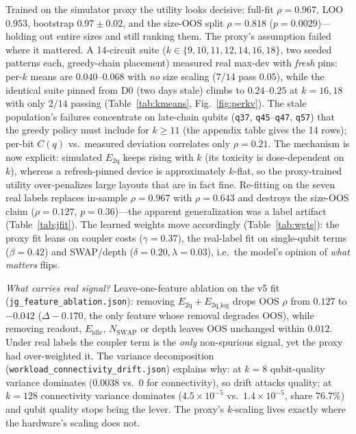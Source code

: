 \documentclass[journal,10pt,twocolumn]{IEEEtran}
\newcommand{\q}[1]{\texttt{q#1}}
\begin{document}
Trained on the simulator proxy the utility looks decisive: full-fit $\rho{=}0.967$, LOO $0.953$, bootstrap
$0.97{\pm}0.02$, and the size-OOS split $\rho{=}0.818$ ($p{=}0.0029$)---holding out entire sizes and still ranking
them. The proxy's assumption failed where it mattered. A 14-circuit suite
($k\in\{9,10,11,12,14,16,18\}$, two seeded patterns each, greedy-chain placement) measured real max-dev with
\emph{fresh} pins: per-$k$ means are $0.040$--$0.068$ with \emph{no} size scaling ($7/14$ pass $0.05$), while the
identical suite pinned from D0 (two days stale) climbs to $0.24$--$0.25$ at $k{=}16,18$ with only $2/14$ passing
(Table~\ref{tab:kmeans}, Fig.~\ref{fig:perkv}). The stale population's failures concentrate on late-chain qubits
(\q{37}, \q{45}--\q{47}, \q{57}) that the greedy policy must include for $k\ge11$ (the appendix table gives the
14 rows); per-bit $C(q)$ vs.\ measured deviation correlates only $\rho{=}0.21$. The mechanism is now explicit:
simulated $E_{\mathrm{2q}}$ keeps rising with $k$ (its toxicity is dose-dependent on $k$), whereas a refresh-pinned
device is approximately $k$-flat, so the proxy-trained utility over-penalizes large layouts that are in fact fine.
Re-fitting on the seven real labels replaces in-sample $\rho{=}0.967$ with $\rho{=}0.643$ and destroys the
size-OOS claim ($\rho{=}0.127$, $p{=}0.36$)---the apparent generalization was a label artifact
(Table~\ref{tab:jfit}). The learned weights move accordingly (Table~\ref{tab:wgts}): the proxy fit leans on coupler
costs ($\gamma{=}0.37$), the real-label fit on single-qubit terms ($\beta{=}0.42$) and SWAP/depth
($\delta{=}0.20,\lambda{=}0.03$), i.e.\ the model's opinion of \emph{what matters} flips.

\emph{What carries real signal?} Leave-one-feature ablation on the v5 fit (\texttt{jg\_feature\_ablation.json}):
removing $E_{\mathrm{2q}}{+}E_{\mathrm{2q\_log}}$ drops OOS $\rho$ from $0.127$ to $-0.042$
($\Delta{-}0.170$, the only feature whose removal degrades OOS), while removing readout, $E_{\mathrm{idle}}$,
$N_{\mathrm{SWAP}}$ or depth leaves OOS unchanged within $0.012$. Under real labels the coupler term is the
\emph{only} non-spurious signal, yet the proxy had over-weighted it. The variance decomposition
(\texttt{workload\_connectivity\_drift.json}) explains why: at $k{=}8$ qubit-quality variance dominates
($0.0038$ vs.\ $0$ for connectivity), so drift attacks quality; at $k{=}128$ connectivity variance dominates
($4.5\times10^{-5}$ vs.\ $1.4\times10^{-5}$, share $76.7\%$) and qubit quality stops being the lever. The proxy's
$k$-scaling lives exactly where the hardware's scaling does not.
\end{document}

